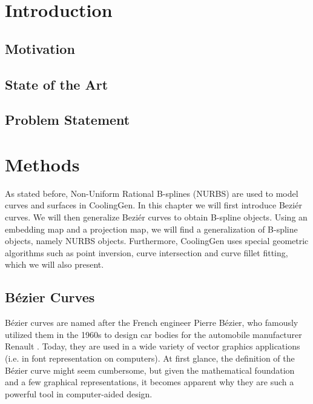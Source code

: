 \documentclass[a4paper, 11pt]{report}
\theoremstyle{definition}
\begin{document}
\restoregeometry
\begin{abstract}
	\thispagestyle{plain}
	\setcounter{page}{3}
	\lipsum[1-3]
\end{abstract}
\renewcommand{\abstractname}{Zusammenfassung}
\begin{abstract}
	\thispagestyle{plain}
	\setcounter{page}{4}
	\lipsum[4-6]
\end{abstract}
\pagebreak

\setcounter{page}{5}
\restoregeometry
\tableofcontents
\pagebreak

\restoregeometry
{}
\setcounter{page}{1}
\pagestyle{plain}

\chapter{Introduction}
\section{Motivation}
\section{State of the Art}
\section{Problem Statement}

\chapter{Methods}
As stated before, Non-Uniform Rational B-splines (NURBS) are used to model curves and surfaces in CoolingGen. In this chapter we will first introduce Beziér curves. We will then generalize Beziér curves to obtain B-spline objects. Using an embedding map and a projection map, we will find a generalization of B-spline objects, namely NURBS objects. Furthermore, CoolingGen uses special geometric algorithms such as point inversion, curve intersection and curve fillet fitting, which we will also present.

\section{Bézier Curves}
Bézier curves are named after the French engineer Pierre Bézier, who famously utilized them in the 1960s to design car bodies for the automobile manufacturer Renault \cite{Bezier1968}. Today, they are used in a wide variety of vector graphics applications (i.e. in font representation on computers). At first glance, the definition of the Bézier curve might seem cumbersome, but given the mathematical foundation and a few graphical representations, it becomes apparent why they are such a powerful tool in computer-aided design.
\end{document}
